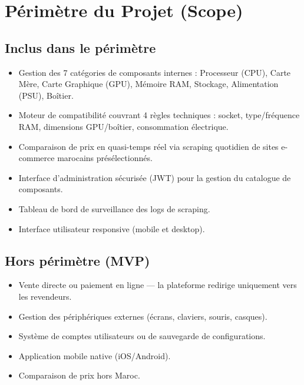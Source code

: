 \documentclass[12pt,a4paper]{article}
\begin{document}
\section{Périmètre du Projet (Scope)}

\subsection{Inclus dans le périmètre}

\begin{itemize}[label=\textbullet]
  \item Gestion des 7 catégories de composants internes : Processeur (CPU), Carte Mère, Carte Graphique (GPU), Mémoire RAM, Stockage, Alimentation (PSU), Boîtier.
  \item Moteur de compatibilité couvrant 4 règles techniques : socket, type/fréquence RAM, dimensions GPU/boîtier, consommation électrique.
  \item Comparaison de prix en quasi-temps réel via scraping quotidien de sites e-commerce marocains présélectionnés.
  \item Interface d'administration sécurisée (JWT) pour la gestion du catalogue de composants.
  \item Tableau de bord de surveillance des logs de scraping.
  \item Interface utilisateur responsive (mobile et desktop).
\end{itemize}

\subsection{Hors périmètre (MVP)}

\begin{itemize}[label=\textbullet]
  \item Vente directe ou paiement en ligne — la plateforme redirige uniquement vers les revendeurs.
  \item Gestion des périphériques externes (écrans, claviers, souris, casques).
  \item Système de comptes utilisateurs ou de sauvegarde de configurations.
  \item Application mobile native (iOS/Android).
  \item Comparaison de prix hors Maroc.
\end{itemize}
\end{document}
